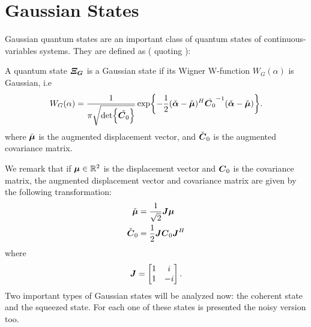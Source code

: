 \section{Gaussian States}
    \label{def:Gaussian}
    Gaussian quantum states are an important class of quantum states of continuous-variables systems.
    They are defined as (\cite{tesiGuerrini} quoting \cite{Gaussian1,Gaussian2,Gaussian3,Gaussian4,Gaussian5}):
    \begin{definition}
        A quantum state $\Operator{\varXi_G}$ is a Gaussian state if its Wigner W-function $W_G(\alpha)$
        is Gaussian, i.e
        \begin{equation}
            W_G(\alpha)=\frac{1}{\pi\sqrt{\det{\check{\Operator{C}_0}}}}\exp{
                -\frac{1}{2}(\check{\Vector{\alpha}}-\check{\Vector{\mu}})^H
                \check{\Operator{C}_0}^{-1}(\check{\Vector{\alpha}}-\check{\Vector{\mu}})}.
        \end{equation}
        where $\check{\Vector{\mu}} $ is the augmented displacement vector, and $\check{\Operator{C}}_0$ 
        is the augmented covariance matrix. 
    \end{definition}
    
    We remark that if $\Vector{\mu} \in \mathbb{R}^2$ is the 
    displacement vector and $\Operator{C}_0$ is the covariance matrix, the augmented displacement vector
    and covariance matrix are given by the following transformation:
    \begin{equation}
        \begin{split}
            \check{\Vector{\mu}} &= \frac{1}{\sqrt{2}} \Operator{J} \Vector{\mu}\\
            \check{\Operator{C}}_0 &= \frac{1}{2} \Operator{J} \Operator{C}_0 \Operator{J}^H
        \end{split}
    \end{equation}
    where
    \begin{equation*}
        \Operator{J} = 
        \begin{bmatrix}
            1 & i\\
            1 & -i
        \end{bmatrix}.
    \end{equation*}
    Two important types of Gaussian states will be analyzed now: the coherent state and the
    squeezed state. For each one of these states is presented the noisy version too.

